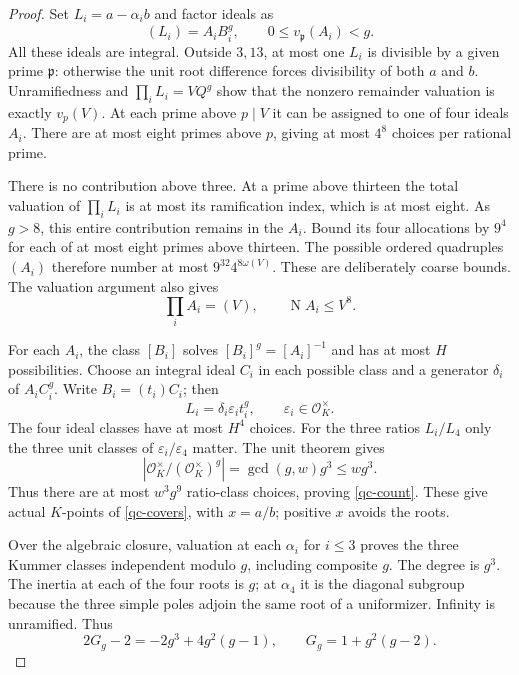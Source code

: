 \begin{proof}
Set $L_i=a-\alpha_i b$ and factor ideals as
\[
 (L_i)=A_iB_i^g,
 \qquad 0\le v_{\mathfrak p}(A_i)<g.
\]
All these ideals are integral. Outside $3,13$, at most one $L_i$ is
divisible by a given prime $\mathfrak p$: otherwise the unit root
difference forces divisibility of both $a$ and $b$. Unramifiedness
and $\prod_iL_i=VQ^g$ show that the nonzero remainder valuation is
exactly $v_p(V)$. At each prime above $p\mid V$ it can be assigned
to one of four ideals $A_i$. There are at most eight primes above $p$,
giving at most $4^8$ choices per rational prime.

There is no contribution above three. At a prime above thirteen the
total valuation of $\prod_iL_i$ is at most its ramification index,
which is at most eight. As $g>8$, this entire contribution remains
in the $A_i$. Bound its four allocations by $9^4$ for each of at most
eight primes above thirteen. The possible ordered quadruples $(A_i)$
therefore number at most $9^{32}4^{8\omega(V)}$. These are deliberately
coarse bounds. The valuation argument also gives
\begin{equation}\label{qc-ideal-product}
 \prod_i A_i=(V),\qquad \operatorname N A_i\le V^8.
\end{equation}

For each $A_i$, the class $[B_i]$ solves
$[B_i]^g=[A_i]^{-1}$ and has at most $H$ possibilities. Choose an
integral ideal $C_i$ in each possible class and a generator $\delta_i$
of $A_iC_i^g$. Write $B_i=(t_i)C_i$; then
\[
 L_i=\delta_i\varepsilon_i t_i^g,
 \qquad \varepsilon_i\in\mathcal O_K^\times.
\]
The four ideal classes have at most $H^4$ choices. For the three
ratios $L_i/L_4$ only the three unit classes of
$\varepsilon_i/\varepsilon_4$ matter. The unit theorem gives
\[
 |\mathcal O_K^\times/(\mathcal O_K^\times)^g|
   =\gcd(g,w)g^3\le wg^3.
\]
Thus there are at most $w^3g^9$ ratio-class choices, proving
\eqref{qc-count}. These give actual $K$-points of
\eqref{qc-covers}, with $x=a/b$; positive $x$ avoids the roots.

Over the algebraic closure, valuation at each $\alpha_i$ for $i\le3$
proves the three Kummer classes independent modulo $g$, including
composite $g$. The degree is $g^3$. The inertia at each of the four
roots is $g$; at $\alpha_4$ it is the diagonal subgroup because the
three simple poles adjoin the same root of a uniformizer. Infinity
is unramified. Thus
\[
 2G_g-2=-2g^3+4g^2(g-1),\qquad G_g=1+g^2(g-2).
\]
\end{proof}

